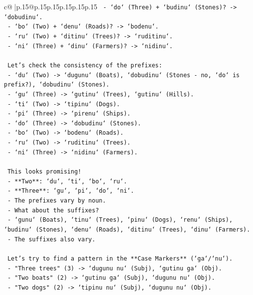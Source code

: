 \documentclass{article}
\begin{document}
{\begin{supertabular}{c@{$\;$}|p{.15\linewidth}@{}p{.15\linewidth}p{.15\linewidth}p{.15\linewidth}p{.15\linewidth}p{.15\linewidth}}
{{{\texttt{   {-} `do` (Three) + `budinu` (Stones)? {-}> `dobudinu`.} \\
\texttt{   {-} `bo` (Two) + `denu` (Roads)? {-}> `bodenu`.} \\
\texttt{   {-} `ru` (Two) + `ditinu` (Trees)? {-}> `ruditinu`.} \\
\texttt{   {-} `ni` (Three) + `dinu` (Farmers)? {-}> `nidinu`.} \\
\\ 
\texttt{   Let's check the consistency of the prefixes:} \\
\texttt{   {-} `du` (Two) {-}> `dugunu` (Boats), `dobudinu` (Stones {-} no, `do` is prefix?), `dobudinu` (Stones).} \\
\texttt{   {-} `gu` (Three) {-}> `gutinu` (Trees), `gutinu` (Hills).} \\
\texttt{   {-} `ti` (Two) {-}> `tipinu` (Dogs).} \\
\texttt{   {-} `pi` (Three) {-}> `pirenu` (Ships).} \\
\texttt{   {-} `do` (Three) {-}> `dobudinu` (Stones).} \\
\texttt{   {-} `bo` (Two) {-}> `bodenu` (Roads).} \\
\texttt{   {-} `ru` (Two) {-}> `ruditinu` (Trees).} \\
\texttt{   {-} `ni` (Three) {-}> `nidinu` (Farmers).} \\
\\ 
\texttt{   This looks promising!} \\
\texttt{   {-} **Two**: `du`, `ti`, `bo`, `ru`.} \\
\texttt{   {-} **Three**: `gu`, `pi`, `do`, `ni`.} \\
\texttt{   {-} The prefixes vary by noun.} \\
\texttt{   {-} What about the suffixes?} \\
\texttt{     {-} `gunu` (Boats), `tinu` (Trees), `pinu` (Dogs), `renu` (Ships), `budinu` (Stones), `denu` (Roads), `ditinu` (Trees), `dinu` (Farmers).} \\
\texttt{     {-} The suffixes also vary.} \\
\\ 
\texttt{   Let's try to find a pattern in the **Case Markers** (`ga`/`nu`).} \\
\texttt{   {-} "Three trees" (3) {-}> `dugunu nu` (Subj), `gutinu ga` (Obj).} \\
\texttt{   {-} "Two boats" (2) {-}> `gutinu ga` (Subj), `dugunu nu` (Obj).} \\
\texttt{   {-} "Two dogs" (2) {-}> `tipinu nu` (Subj), `dugunu nu` (Obj).} \\
}}}
\end{supertabular}}
\end{document}
